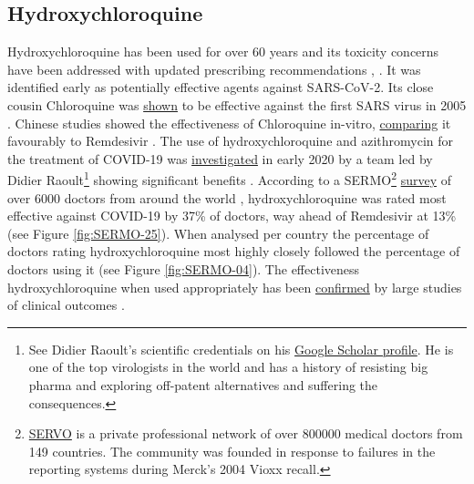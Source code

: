 \documentclass[11pt,a4paper,notitlepage]{report}
\begin{document}
\subsection*{Hydroxychloroquine}


Hydroxychloroquine has been used for over 60 years and its toxicity concerns have been addressed with updated prescribing recommendations \cite{Shippey459}, \cite{lupus20092017}. It was identified early as potentially effective agents against SARS-CoV-2. Its close cousin Chloroquine was \href{https://doi.org/10.1186/1743-422X-2-69}{shown} to be effective against the first SARS virus  in 2005 \cite{Vincent2005}. Chinese studies showed the effectiveness of Chloroquine in-vitro, \href{https://doi.org/10.1038/s41422-020-0282-0}{comparing} it favourably to Remdesivir \cite{Wang2020}. The use of hydroxychloroquine and azithromycin for the treatment of COVID-19 was \href{https://pubmed.ncbi.nlm.nih.gov/32205204/}{investigated} in early 2020 by a team led by Didier Raoult\footnote{See Didier Raoult's scientific credentials on his \href{https://scholar.google.fr/citations?user=n8EF_6kAAAAJ&hl=fr}{Google Scholar profile}. He is one of the top virologists in the world and has a history of resisting big pharma and exploring off-patent alternatives \cite{doi:10.1177/1440783320936740} and suffering the consequences.} showing significant benefits \cite{Lagier2020-dw}. According to a SERMO\footnote{\href{https://www.sermo.com/}{SERVO} is a private professional network of over 800000 medical doctors from 149 countries. The community was founded in response to failures in the reporting systems during Merck's 2004 Vioxx recall.} \href{https://public-cdn.sermo.com/covid19/c8/be4e/4edbd4/dbd4ba4ac5a3b3d9a479f99cc5/wave-i-sermo-covid-19-global-analysis-final.pdf}{survey} of over 6000 doctors from around the world \cite{sermo25032020}, hydroxychloroquine was rated most effective against COVID-19 by 37\% of doctors, way ahead of Remdesivir at 13\% (see Figure \ref{fig:SERMO-25}). When analysed per country the percentage of doctors rating hydroxychloroquine most highly closely followed the percentage of doctors using it (see Figure \ref{fig:SERMO-04}). The effectiveness hydroxychloroquine when used appropriately has been \href{https://www.ncbi.nlm.nih.gov/pmc/articles/PMC8023208/}{confirmed} by large studies of clinical outcomes \cite{Mokhtari2021-ot}. 



\end{document}
